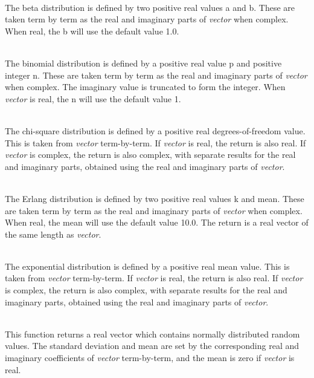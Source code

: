 \begin{description}
\item{}\\
The beta distribution is defined by two positive real values {\vt a}
and {\vt b}.  These are taken term by term as the real and imaginary
parts of {\it vector} when complex.  When real, the {\vt b} will use
the default value 1.0.

\item{}\\
The binomial distribution is defined by a positive real value {\vt p}
and positive integer {\vt n}.  These are taken term by term as the
real and imaginary parts of {\it vector} when complex.  The imaginary
value is truncated to form the integer.  When {\it vector} is real,
the {\vt n} will use the default value 1.

\item{}\\
The chi-square distribution is defined by a positive real
degrees-of-freedom value.  This is taken from {\it vector}
term-by-term.  If {\it vector} is real, the return is also real.  If
{\it vector} is complex, the return is also complex, with separate
results for the real and imaginary parts, obtained using the real and
imaginary parts of {\it vector}.

\item{}\\
The Erlang distribution is defined by two positive real values {\vt k}
and {\vt mean}.  These are taken term by term as the real and
imaginary parts of {\it vector} when complex.  When real, the {\vt
mean} will use the default value 10.0.  The return is a real vector of
the same length as {\it vector}.

\item{}\\
The exponential distribution is defined by a positive real mean value. 
This is taken from {\it vector} term-by-term.  If {\it vector} is
real, the return is also real.  If {\it vector} is complex, the return
is also complex, with separate results for the real and imaginary
parts, obtained using the real and imaginary parts of {\it vector}.

\item{}\\
This function returns a real vector which contains normally
distributed random values.  The standard deviation and mean are set by
the corresponding real and imaginary coefficients of {\it vector}
term-by-term, and the mean is zero if {\it vector} is real.


\end{description}
